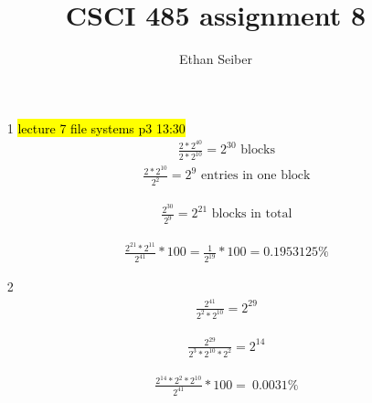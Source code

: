 \documentclass[12pt]{article}
\author{Ethan Seiber}
\title{CSCI 485 assignment 8}
\begin{document}
\maketitle

\begin{enumerate}
\item[1] \hl{lecture 7 file systems p3 13:30}
	\begin{align*}%
	\frac{2*2^{40}}{2*2^{10}}= 2^{30}\text{ blocks}
	\end{align*}
	\begin{align*}%
	\frac{2*2^{10}}{2^2} = 2^9\text{ entries in one block}
	\end{align*}
	
	\begin{align*}%
	\frac{2^{30}}{2^9} = 2^{21}\text{ blocks in total}
	\end{align*}
	
	\begin{align*}
	\frac{2^{21}*2^{11}}{2^{41}}*100 = \frac{1}{2^{19}}*100 = 0.1953125\%
	\end{align*}

      \item[2]
        \begin{align*}%
          \frac{2^{41}}{2^2*2^{10}} = 2^{29}
          \end{align*}

        \begin{align*}%
          \frac{2^{29}}{2^3*2^{10}*2^2} = 2^{14}
        \end{align*}

        \begin{align*}%
          \frac{2^{14}*2^2*2^{10}}{2^{41}}*100 = ~0.0031\%
          \end{align*}
\end{enumerate}
\end{document}
